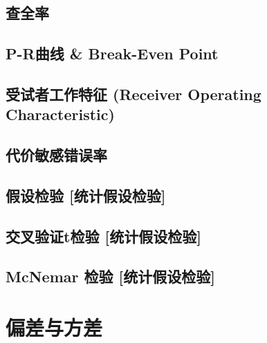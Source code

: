 \documentclass[oneside]{book}
\begin{document}
			\subsection{查全率}
			\subsection{P-R曲线 \& Break-Even Point}
			\subsection{受试者工作特征 (Receiver Operating Characteristic)}
			\subsection{代价敏感错误率}
			\subsection{假设检验 [统计假设检验]}
			\subsection{交叉验证t检验 [统计假设检验]}
			\subsection{McNemar 检验 [统计假设检验]}
		\section{偏差与方差}
\end{document}
